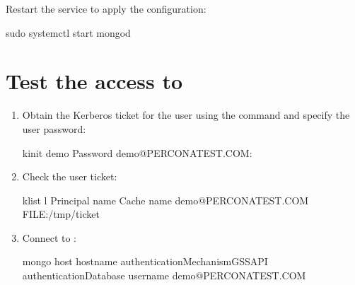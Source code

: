 \documentclass[letterpaper,10pt,english]{sphinxmanual}
\begin{document}
\sphinxAtStartPar
Restart the  service to apply the configuration:

\begin{sphinxVerbatim}[commandchars=\\\{\}]
\PYGZdl{} sudo systemctl start mongod
\end{sphinxVerbatim}


\section{Test the access to }
\label{\detokenize{kerberos:test-the-access-to-psmdb}}\begin{enumerate}
%
\item {} 
\sphinxAtStartPar
Obtain the Kerberos ticket for the user using the  command and specify the user password:

\begin{sphinxVerbatim}[commandchars=\\\{\}]
\PYGZdl{} kinit demo
Password  demo@PERCONATEST.COM:
\end{sphinxVerbatim}

\item {} 
\sphinxAtStartPar
Check the user ticket:

\begin{sphinxVerbatim}[commandchars=\\\{\}]
\PYGZdl{} klist \PYGZhy{}l
Principal name                 Cache name
\PYGZhy{}\PYGZhy{}\PYGZhy{}\PYGZhy{}\PYGZhy{}\PYGZhy{}\PYGZhy{}\PYGZhy{}\PYGZhy{}\PYGZhy{}\PYGZhy{}\PYGZhy{}\PYGZhy{}\PYGZhy{}                 \PYGZhy{}\PYGZhy{}\PYGZhy{}\PYGZhy{}\PYGZhy{}\PYGZhy{}\PYGZhy{}\PYGZhy{}\PYGZhy{}\PYGZhy{}
demo@PERCONATEST.COM           FILE:/tmp/\PYGZlt{}ticket\PYGZgt{}
\end{sphinxVerbatim}

\item {} 
\sphinxAtStartPar
Connect to :

\begin{sphinxVerbatim}[commandchars=\\\{\}]
\PYGZdl{} mongo \PYGZhy{}\PYGZhy{}host \PYGZlt{}hostname\PYGZgt{} \PYGZhy{}\PYGZhy{}authenticationMechanismGSSAPI \PYGZhy{}\PYGZhy{}authenticationDatabase \PYGZhy{}\PYGZhy{}username demo@PERCONATEST.COM
\end{sphinxVerbatim}

\end{enumerate}
\end{document}
